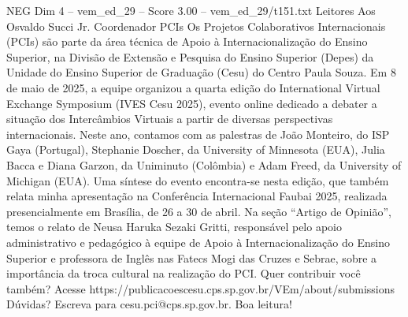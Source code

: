 \begin{textsample}{NEG Dim 4 – vem\_ed\_29 – Score 3.00 – vem\_ed\_29/t151.txt}  \label{ex:f4_neg_160}
Leitores Aos Osvaldo Succi Jr.
Coordenador PCIs Os Projetos Colaborativos Internacionais (PCIs) são parte da área técnica de Apoio à Internacionalização do Ensino Superior, na Divisão de Extensão e Pesquisa do Ensino Superior (Depes) da Unidade do Ensino Superior de Graduação (Cesu) do Centro Paula Souza.
Em 8 de maio de 2025, a equipe organizou a quarta edição do International Virtual Exchange Symposium (IVES Cesu 2025), evento online dedicado a debater a situação dos Intercâmbios Virtuais a partir de diversas perspectivas internacionais.
Neste ano, contamos com as palestras de João Monteiro, do ISP Gaya (Portugal), Stephanie Doscher, da University of Minnesota (EUA), Julia Bacca e Diana Garzon, da Uniminuto (Colômbia) e Adam Freed, da University of Michigan (EUA).
Uma síntese do evento encontra-se nesta edição, que também relata minha apresentação na Conferência Internacional Faubai 2025, realizada presencialmente em Brasília, de 26 a 30 de abril.
Na seção “Artigo de Opinião”, temos o relato de Neusa Haruka Sezaki Gritti, responsável pelo apoio administrativo e pedagógico à equipe de Apoio à Internacionalização do Ensino Superior e professora de Inglês nas Fatecs Mogi das Cruzes e Sebrae, sobre a importância da troca cultural na realização do PCI.
Quer contribuir você também?
Acesse https://publicacoescesu.cps.sp.gov.br/VEm/about/submissions Dúvidas?
Escreva para cesu.pci@cps.sp.gov.br.
Boa leitura!

\end{textsample}
